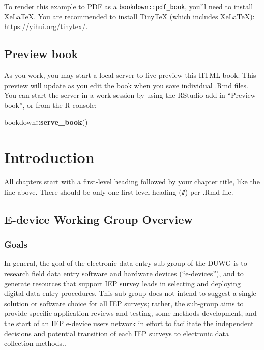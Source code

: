 \documentclass[
]{book}
\newenvironment{Shaded}{\begin{snugshade}}{\end{snugshade}}
\newcommand{\FunctionTok}[1]{\textcolor[rgb]{0.13,0.29,0.53}{\textbf{#1}}}
\newcommand{\NormalTok}[1]{#1}
\newcommand{\SpecialCharTok}[1]{\textcolor[rgb]{0.81,0.36,0.00}{\textbf{#1}}}
\theoremstyle{definition}
\theoremstyle{definition}
\theoremstyle{definition}
\theoremstyle{definition}
\theoremstyle{remark}
\begin{document}
To render this example to PDF as a \texttt{bookdown::pdf\_book}, you'll need to install XeLaTeX. You are recommended to install TinyTeX (which includes XeLaTeX): \url{https://yihui.org/tinytex/}.

\hypertarget{preview-book}{%
\section{Preview book}\label{preview-book}}

As you work, you may start a local server to live preview this HTML book. This preview will update as you edit the book when you save individual .Rmd files. You can start the server in a work session by using the RStudio add-in ``Preview book'', or from the R console:

\begin{Shaded}
\begin{Highlighting}[]
\NormalTok{bookdown}\SpecialCharTok{::}\FunctionTok{serve\_book}\NormalTok{()}
\end{Highlighting}
\end{Shaded}

\hypertarget{introduction}{%
\chapter{Introduction}\label{introduction}}

All chapters start with a first-level heading followed by your chapter title, like the line above. There should be only one first-level heading (\texttt{\#}) per .Rmd file.

\hypertarget{e-device-working-group-overview}{%
\section{E-device Working Group Overview}\label{e-device-working-group-overview}}

\hypertarget{goals}{%
\subsection{Goals}\label{goals}}

In general, the goal of the electronic data entry sub-group of the DUWG is to research field data entry software and hardware devices (``e-devices''), and to generate resources that support IEP survey leads in selecting and deploying digital data-entry procedures. This sub-group does not intend to suggest a single solution or software choice for all IEP surveys; rather, the sub-group aims to provide specific application reviews and testing, some methods development, and the start of an IEP e-device users network in effort to facilitate the independent decisions and potential transition of each IEP surveys to electronic data collection methods..
\end{document}
